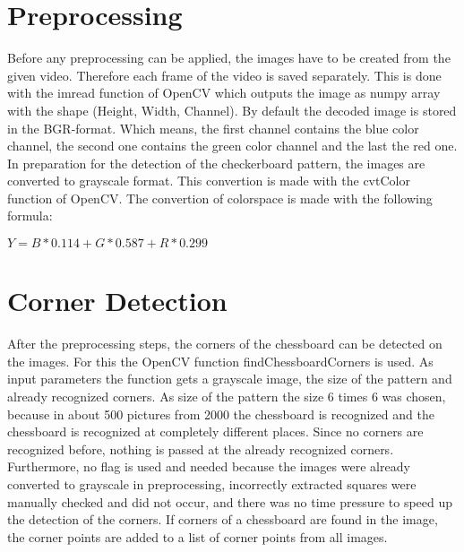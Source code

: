 \documentclass[twocolumn,10pt]{asme2ej}
\begin{document}
\section{Preprocessing}
\label{section:preprocessing}
\noindent
Before any preprocessing can be applied, the images have to be created from the given video. Therefore each frame of the video is saved separately. This is done with the imread function\cite{opencv_imread} of OpenCV which 
outputs the image as numpy array with the shape (Height, Width, Channel). By default the decoded image is stored in the BGR-format. Which means, the first channel contains the
blue color channel, the second one contains the green color channel and the last the red one. In preparation for the detection of the checkerboard pattern, the images are converted to grayscale format. 
This convertion is made with the cvtColor function\cite{opencv_cvtColor} of OpenCV. The convertion of colorspace is made with the following
formula\cite{opencv_rgb2gray}:
\begin{center}
    $Y = B * 0.114 + G * 0.587 + R * 0.299$
    \label{eq_rgb2gray}
\end{center}




\section{Corner Detection}
\label{section:edgedetection}
\noindent
After the preprocessing steps, the corners of the chessboard can be detected on the images. For this the OpenCV function findChessboardCorners\cite{opencv_findChessboardCorners} is used. As input parameters the function gets a grayscale image, the size of the pattern and already recognized corners. As size of the pattern the size 6 times 6 was chosen, because in about 500 pictures from 2000 the chessboard is recognized and the chessboard is recognized at completely different places. Since no corners are recognized before, nothing is passed at the already recognized corners. Furthermore, no flag is used and needed because the images were already converted to grayscale in preprocessing, incorrectly extracted squares were manually checked and did not occur, and there was no time pressure to speed up the detection of the corners.
If corners of a chessboard are found in the image, the corner points are added to a list of corner points from all images.
\end{document}
